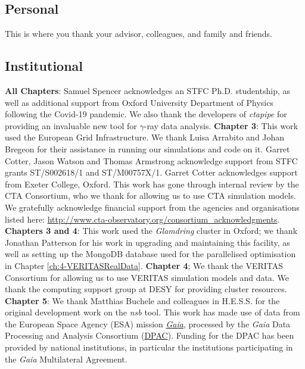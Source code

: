 \subsection*{Personal}

This is where you thank your advisor, colleagues, and family and friends.
\iffalse

\fi
\subsection*{Institutional}
\textbf{All Chapters}: Samuel Spencer acknowledges an STFC Ph.D. studentship, as well as additional support from Oxford University Department of Physics following the Covid-19 pandemic. We also thank the developers of \textit{ctapipe} for providing an invaluable new tool for $\gamma$-ray data analysis. \newline
\textbf{Chapter 3}: This work used the European Grid Infrastructure. We thank Luisa Arrabito and Johan Bregeon for their assistance in running our simulations and code on it. Garret Cotter, Jason Watson and Thomas Armstrong acknowledge support from STFC grants ST/S002618/1 and ST/M00757X/1. Garret Cotter acknowledges support from Exeter College, Oxford. This work has gone through internal review by the CTA Consortium, who we thank for allowing us to use CTA simulation models. We gratefully acknowledge financial support from the agencies and organisations listed here: \url{http://www.cta-observatory.org/consortium\_acknowledgments}. \newline
\textbf{Chapters 3 and 4}: This work used the \textit{Glamdring} cluster in Oxford; we thank Jonathan Patterson for his work in upgrading and maintaining this facility, as well as setting up the MongoDB database used for the parallelised optimisation in Chapter \ref{ch:4-VERITASRealData}. \newline
\textbf{Chapter 4}; We thank the VERITAS Consortium for allowing us to use VERITAS simulation models and data. We thank the computing support group at DESY for providing cluster resources. \newline
\textbf{Chapter 5}: We thank Matthias Buchele and colleagues in H.E.S.S. for the original development work on the \textit{nsb} tool. This work has made use of data from the European Space Agency (ESA) mission \href{https://www.cosmos.esa.int/gaia}{\textit{Gaia}}, processed by the \textit{Gaia} Data Processing and Analysis Consortium (\href{https://www.cosmos.esa.int/web/gaia/dpac/consortium}{DPAC}). Funding for the DPAC has been provided by national institutions, in particular the institutions participating in the \textit{Gaia} Multilateral Agreement.